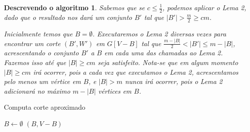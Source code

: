 \documentclass[a4paper,12pt]{article}
\newtheorem{alg}{Descrevendo o algoritmo}
\begin{document}
\medskip

\begin{alg}
	
	Sabemos que se $c \le \frac{1}{2}$, podemos aplicar o Lema 2, 
	dado que o resultado nos dará um conjunto $B'$ tal que
	$|B'|>\frac{m}{2}\ge cm$.

	Inicialmente temos que $B = \emptyset$.
	Executaremos o Lema 2 diversas vezes para encontrar 
	um corte $(B',W')$ em $G[V-B]$ tal que $\frac{m-|B|}{2}<|B'|\le m-|B|$,
	acrescentando o conjunto $B'$ a $B$ em cada uma das chamadas ao Lema 2.
	Fazemos isso até que $|B|\ge cm$ seja satisfeito.
	Nota-se que em algum momento $|B|\ge cm$ irá ocorrer, pois a cada vez
	que executamos o Lema 2, acrescentamos pelo menos um vértice em $B$,
	e $|B|>m$ nunca irá ocorrer, pois o Lema 2 adicionará no máximo 
	$m-|B|$ vértices em $B$.

\end{alg}

\begin{algorithm}[H]

	\caption{Computa corte aproximado}
	$B \gets \emptyset$\;
	{
	}
	\Return $(B,V-B)$

\end{algorithm}	

\newpage


\end{document}
